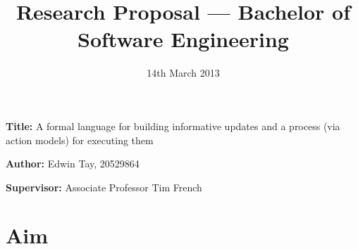\documentclass[12pt, a4paper]{article}
\title{Research Proposal --- Bachelor of Software Engineering}
\date{14th March 2013}
\newcommand{\namelistlabel}[1]{\mbox{#1}\hfil}
\newenvironment{namelist}[1]{%
\begin{list}{}
    {
        \let\makelabel\namelistlabel
        \settowidth{\labelwidth}{#1}
        \setlength{\leftmargin}{1.1\labelwidth}
    }
  }{%
\end{list}}
\begin{document}
\maketitle

\begin{namelist}{}
\item[{\bf Title:}]
	A formal language for building informative updates and a process (via
  action models) for executing them
  \item[{\bf Author:}]
	Edwin Tay, 20529864
\item[{\bf Supervisor:}]
	Associate Professor Tim French
\end{namelist}

\section*{Aim}
\end{document}
